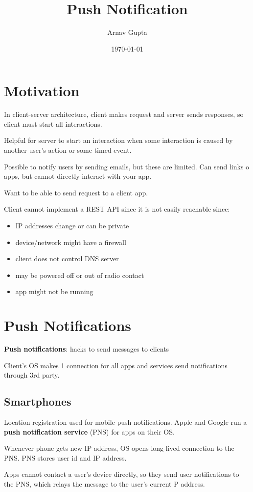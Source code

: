 \documentclass[11pt]{article}
\author{Arnav Gupta}
\date{\today}
\title{Push Notification}
\begin{document}
\maketitle
\tableofcontents

\section{Motivation}
\label{sec:org8a012bc}
In client-server architecture, client makes request and server sends responses, so client
must start all interactions.

Helpful for server to start an interaction when some interaction is caused by another user's action or
some timed event.

Possible to notify users by sending emails, but these are limited.
Can send links o apps, but cannot directly interact with your app.

Want to be able to send request to a client app.

Client cannot implement a REST API since it is not easily reachable since:
\begin{itemize}
\item IP addresses change or can be private
\item device/network might have a firewall
\item client does not control DNS server
\item may be powered off or out of radio contact
\item app might not be running
\end{itemize}
\section{Push Notifications}
\label{sec:org18c4d21}
\textbf{Push notifications}: hacks to send messages to clients

Client's OS makes 1 connection for all apps and services send notifications through 3rd party.
\subsection{Smartphones}
\label{sec:org12678b5}
Location registration used for mobile push notifications.
Apple and Google run a \textbf{push notification service} (PNS) for apps on their OS.

Whenever phone gets new IP address, OS opens long-lived connection to the PNS.
PNS stores user id and IP address.

Apps cannot contact a user's device directly, so they send user notifications to the PNS, which
relays the message to the user's current P address.
\end{document}
